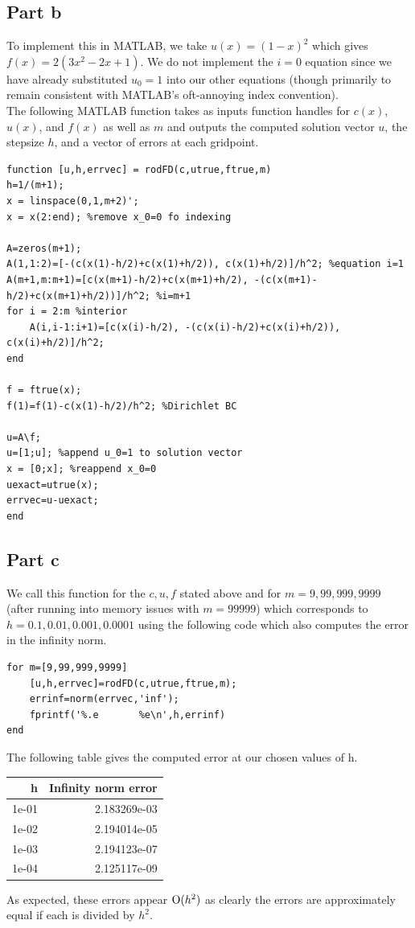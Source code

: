 \documentclass{article}
\begin{document}
\subsection{Part b}
To implement this in MATLAB, we take $u(x) = (1-x )^2$ which gives $f(x) = 2( 3 x^2 - 2 x + 1 )$. We do not implement the $i=0$ equation since we have already substituted $u_0=1$ into our other equations (though primarily to remain consistent with MATLAB's oft-annoying index convention). \\
The following MATLAB function takes as inputs function handles for $c(x)$, $u(x)$, and $f(x)$ as well as $m$ and outputs the computed solution vector $u$, the stepsize $h$, and a vector of errors at each gridpoint. 
\begin{verbatim}
function [u,h,errvec] = rodFD(c,utrue,ftrue,m)
h=1/(m+1);
x = linspace(0,1,m+2)';
x = x(2:end); %remove x_0=0 fo indexing

A=zeros(m+1);
A(1,1:2)=[-(c(x(1)-h/2)+c(x(1)+h/2)), c(x(1)+h/2)]/h^2; %equation i=1
A(m+1,m:m+1)=[c(x(m+1)-h/2)+c(x(m+1)+h/2), -(c(x(m+1)-h/2)+c(x(m+1)+h/2))]/h^2; %i=m+1
for i = 2:m %interior
    A(i,i-1:i+1)=[c(x(i)-h/2), -(c(x(i)-h/2)+c(x(i)+h/2)), c(x(i)+h/2)]/h^2;
end

f = ftrue(x);
f(1)=f(1)-c(x(1)-h/2)/h^2; %Dirichlet BC

u=A\f;
u=[1;u]; %append u_0=1 to solution vector
x = [0;x]; %reappend x_0=0
uexact=utrue(x);
errvec=u-uexact;
end
\end{verbatim}

\subsection{Part c}
We call this function for the $c,u,f$ stated above and for $m=9,99,999,9999$ (after running into memory issues with $m=99999$) which corresponds to $h=0.1,0.01,0.001,0.0001$ using the following code which also computes the error in the infinity norm.
\begin{verbatim}
for m=[9,99,999,9999]
    [u,h,errvec]=rodFD(c,utrue,ftrue,m);
    errinf=norm(errvec,'inf');
    fprintf('%.e       %e\n',h,errinf)
end
\end{verbatim}
The following table gives the computed error at our chosen values of h.
\begin{table}[H]\centering
\begin{tabular}{|r|r|} \hline
{h}&{Infinity norm error}\\\hline
1e-01&       2.183269e-03\\
1e-02&       2.194014e-05\\
1e-03&       2.194123e-07\\
1e-04&       2.125117e-09\\\hline
\end{tabular}
\end{table}
As expected, these errors appear $\operatorname{O}(h^2)$ as clearly the errors are approximately equal if each is divided by $h^2$. 
\end{document}
